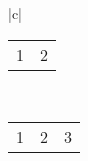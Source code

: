 \begin{tabular}{|c|}
 \\ \hline
\begin{tabular}{@{}c|c@{}} 1 & 2 \end{tabular} \\ \hline
\begin{tabular}{@{}c|c|c@{}} 1 & 2 & 3\end{tabular} \\ \hline
\end{tabular}

